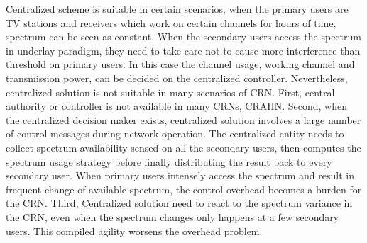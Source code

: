 Centralized scheme is suitable in certain scenarios, \eg when the primary users are TV stations and receivers which work on certain channels for hours of time, spectrum can be seen as constant. 
When the secondary users access the spectrum in underlay paradigm, they need to take care not to cause more interference than threshold on primary users.
In this case the channel usage, \ie working channel and transmission power, can be decided on the centralized controller.
%
Nevertheless, centralized solution is not suitable in many scenarios of CRN.
First, central authority or controller is not available in many CRNs, \eg CRAHN.
Second, when the centralized decision maker exists, centralized solution involves a large number of control messages during network operation.
The centralized entity needs to collect spectrum availability sensed on all the secondary users, then computes the spectrum usage strategy before finally distributing the result back to every secondary user.
When primary users intensely access the spectrum and result in frequent change of available spectrum, the control overhead becomes a burden for the CRN.
Third, Centralized solution need to react to the spectrum variance in the CRN, even when the spectrum changes only happens at a few secondary users.
This compiled agility worsens the overhead problem.






